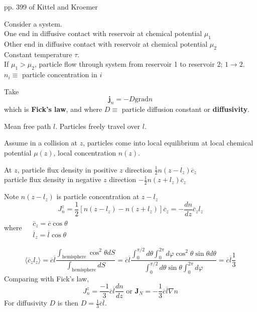 pp. 399 of Kittel and Kroemer \cite{CKittelHKroemer1980}

Consider a system.  \\
One end in diffusive contact with reservoir at chemical potential $\mu_1$ \\
Other end in diffusive contact with reservoir at chemical potential $\mu_2$ \\
Constant temperature $\tau$.  \\
If $\mu_1 > \mu_2$, particle flow through system from reservoir 1 to reservoir 2; $1\to 2$.   \\
$n_i \equiv $ particle concentration in $i$ 

Take
\begin{equation}
\mathbf{j}_n = -D \text{grad}n
\end{equation}
which is \textbf{Fick's law}, and where $D \equiv$ particle diffusion constant or \textbf{diffusivity}.  

Mean free path $l$.  Particles freely travel over $l$.  

Assume in a collision at $z$, particles come into local equilibrium at local chemical potential $\mu(z)$, local concentration $n(z)$.  

At $z$, particle flux density in positive $z$ direction \qquad $\frac{1}{2} n(z-l_z) \overline{c}_z$ \\
\phantom{At $z$, } particle flux density in negative $z$ direction \qquad $-\frac{1}{2} n(z+l_z) \overline{c}_z$

Note $n(z-l_z)$ is particle concentration at $z-l_z$
\[
J_n^z = \frac{1}{2} \left[ n(z-l_z) - n(z+l_z) \right] \overline{c}_z = -\frac{dn}{dz} \overline{c}_z l_z
\]
where $\begin{aligned} & \quad \\
  & \overline{c}_z = \overline{c} \cos{\theta}  \\
  & \overline{l}_z = \overline{l} \cos{\theta}  
\end{aligned}$

\[
\langle \overline{c}_z l_z \rangle = \overline{c} \overline{l} \frac{ \int_{\text{hemisphere} } \cos^2{\theta} dS }{ \int_{\text{hemisphere} } dS } = \overline{c}\overline{l} \frac{ \int_0^{\pi/2}d\theta \int_0^{2\pi } d\varphi \cos^2{\theta} \sin{\theta} d\theta }{ \int_0^{\pi/2} d\theta \sin{\theta} \int_0^{2\pi } d\varphi } = \overline{c} \overline{l} \frac{1}{3}
\]
Comparing with Fick's law, 
\[
J_n^z = \frac{-1}{3} \overline{c}\overline{l} \frac{dn}{dz} \text{ or } \mathbf{J}_N = -\frac{1}{3} \overline{c}\overline{l} \nabla n
\]
For diffusivity $D$ is then $D = \frac{1}{3} \overline{c}\overline{l}$.  

